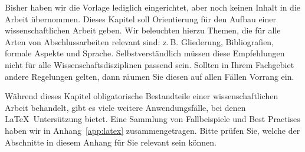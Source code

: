 Bisher haben wir die Vorlage lediglich eingerichtet, aber noch keinen Inhalt in
die Arbeit übernommen. Dieses Kapitel soll Orientierung für den Aufbau einer
wissenschaftlichen Arbeit geben. Wir beleuchten hierzu Themen, die für alle
Arten von Abschlussarbeiten relevant sind: z.\,B. Gliederung, Bibliografien,
formale Aspekte und Sprache. Selbstverständlich müssen diese Empfehlungen nicht
für alle Wissenschaftsdisziplinen passend sein. Sollten in Ihrem Fachgebiet
andere Regelungen gelten, dann räumen Sie diesen auf allen Fällen Vorrang ein.

Während dieses Kapitel obligatorische Bestandteile einer wissenschaftlichen
Arbeit behandelt, gibt es viele weitere Anwendungsfälle, bei denen \LaTeX\ 
Untersützung bietet. Eine Sammlung von Fallbeispiele und Best Practises haben
wir in Anhang~\ref{app:latex} zusammengetragen. Bitte prüfen Sie, welche der
Abschnitte in diesem Anhang für Sie relevant sein können.
